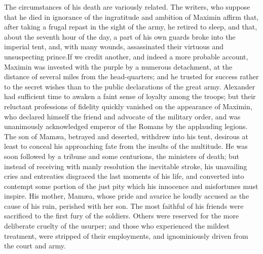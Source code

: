 The circumstances of his death are variously related. The
writers, who suppose that he died in ignorance of the ingratitude
and ambition of Maximin affirm that, after taking a frugal repast
in the sight of the army, he retired to sleep, and that, about
the seventh hour of the day, a part of his own guards broke into
the imperial tent, and, with many wounds, assassinated their
virtuous and unsuspecting prince.\footnotemark[5] If we credit another, and
indeed a more probable account, Maximin was invested with the
purple by a numerous detachment, at the distance of several miles
from the head-quarters; and he trusted for success rather to the
secret wishes than to the public declarations of the great army.
Alexander had sufficient time to awaken a faint sense of loyalty
among the troops; but their reluctant professions of fidelity
quickly vanished on the appearance of Maximin, who declared
himself the friend and advocate of the military order, and was
unanimously acknowledged emperor of the Romans by the applauding
legions. The son of Mamæa, betrayed and deserted, withdrew into
his tent, desirous at least to conceal his approaching fate from
the insults of the multitude. He was soon followed by a tribune
and some centurions, the ministers of death; but instead of
receiving with manly resolution the inevitable stroke, his
unavailing cries and entreaties disgraced the last moments of his
life, and converted into contempt some portion of the just pity
which his innocence and misfortunes must inspire. His mother,
Mamæa, whose pride and avarice he loudly accused as the cause of
his ruin, perished with her son. The most faithful of his friends
were sacrificed to the first fury of the soldiers. Others were
reserved for the more deliberate cruelty of the usurper; and
those who experienced the mildest treatment, were stripped of
their employments, and ignominiously driven from the court and
army.\footnotemark[6]




